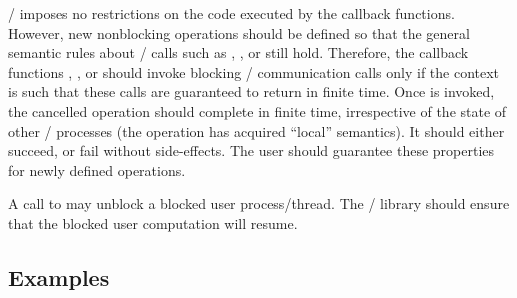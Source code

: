 \MPI/ imposes no restrictions on the code executed by the callback functions.
However, new nonblocking operations should be defined so that the general
semantic rules about \MPI/ calls such as ,
, or  still hold. 
Therefore, the
callback functions , , or
 should invoke blocking \MPI/ communication
calls only if the context is such that these calls are guaranteed to
return in finite time.  
Once  is invoked, the cancelled operation
should complete in finite time, irrespective of the state of
other \MPI/ processes (the operation has acquired ``local'' semantics).  It
should either succeed, or fail without side-effects.  The user should
guarantee these properties for newly defined operations.  

\begin{implementors}
A call to  may unblock a blocked user
process/thread. The \MPI/ library should ensure that the blocked user
computation will resume.
\end{implementors}

\subsection{Examples}

